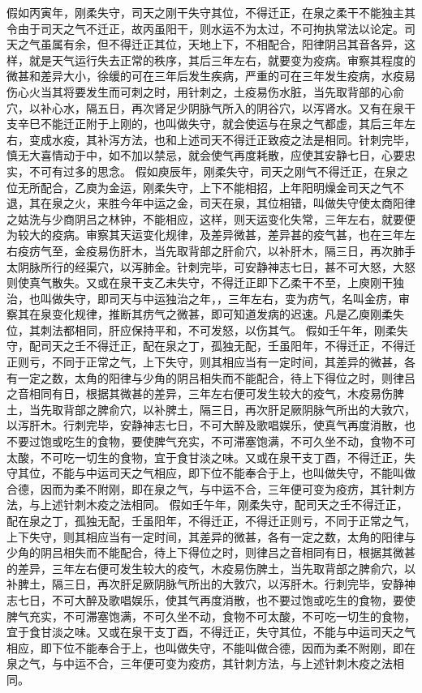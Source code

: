 \documentclass[a4paper,12pt,UTF8,twoside]{ctexbook}
\begin{document}
假如丙寅年，刚柔失守，司天之刚干失守其位，不得迁正，在泉之柔干不能独主其令由于司天之气不迁正，故丙虽阳干，则水运不为太过，不可拘执常法以论定。司天之气虽属有余，但不得迁正其位，天地上下，不相配合，阳律阴吕其音各异，这样，就是天气运行失去正常的秩序，其后三年左右，就要变为疫病。审察其程度的微甚和差异大小，徐缓的可在三年后发生疾病，严重的可在三年发生疫病，水疫易伤心火当其将要发生而可刺之时，用针刺之，土疫易伤水脏，当先取背部的心俞穴，以补心水，隔五日，再次肾足少阴脉气所入的阴谷穴，以泻肾水。又有在泉干支辛巳不能迁正附于上刚的，也叫做失守，就会使运与在泉之气都虚，其后三年左右，变成水疫，其补泻方法，也和上述司天不得迁正致疫之法是相同。针刺完毕，慎无大喜情动于中，如不加以禁忌，就会使气再度耗散，应使其安静七日，心要忠实，不可有过多的思念。
假如庾辰年，刚柔失守，司天之刚气不得迁正，在泉之位无所配合，乙庾为金运，刚柔失守，上下不能相招，上年阳明燥金司天之气不退，其在泉之火，来胜今年中运之金，司天在泉，其位相错，叫做失守使太商阳律之姑洗与少商阴吕之林钟，不能相应，这样，则天运变化失常，三年左右，就要便为较大的疫病。审察其天运变化规律，及差异微甚，差异甚的疫气甚，也在三年左右疫疠气至，金疫易伤肝木，当先取背部之肝俞穴，以补肝木，隔三日，再次肺手太阴脉所行的经渠穴，以泻肺金。针刺完毕，可安静神志七日，甚不可大怒，大怒则使真气散失。又或在泉干支乙未失守，不得迁正即下乙柔干不至，上庾刚干独治，也叫做失守，即司天与中运独治之年，，三年左右，变为疠气，名叫金疠，审察其在泉变化规律，推断其疠气之微甚，即可知道发病的迟速。凡是乙庾刚柔失位，其刺法都相同，肝应保持平和，不可发怒，以伤其气。
假如壬午年，刚柔失守，配司天之壬不得迁正，配在泉之丁，孤独无配，壬虽阳年，不得迁正，不得迁正则亏，不同于正常之气，上下失守，则其相应当有一定时间，其差异的微甚，各有一定之数，太角的阳律与少角的阴吕相失而不能配合，待上下得位之时，则律吕之音相同有日，根据其微甚的差异，三年左右便可发生较大的疫气，木疫易伤脾土，当先取背部之脾俞穴，以补脾土，隔三日，再次肝足厥阴脉气所出的大敦穴，以泻肝木。行刺完毕，安静神志七日，不可大醉及歌唱娱乐，使真气再度消散，也不要过饱或吃生的食物，要使脾气充实，不可滞塞饱满，不可久坐不动，食物不可太酸，不可吃一切生的食物，宜于食甘淡之味。又或在泉干支丁酉，不得迁正，失守其位，不能与中运司天之气相应，即下位不能奉合于上，也叫做失守，不能叫做合德，因而为柔不附刚，即在泉之气，与中运不合，三年便可变为疫疠，其针刺方法，与上述针刺木疫之法相同。
假如壬午年，刚柔失守，配司天之壬不得迁正，配在泉之丁，孤独无配，壬虽阳年，不得迁正，不得迁正则亏，不同于正常之气，上下失守，则其相应当有一定时间，其差异的微甚，各有一定之数，太角的阳律与少角的阴吕相失而不能配合，待上下得位之时，则律吕之音相同有日，根据其微甚的差异，三年左右便可发生较大的疫气，木疫易伤脾土，当先取背部之脾俞穴，以补脾土，隔三日，再次肝足厥阴脉气所出的大敦穴，以泻肝木。行刺完毕，安静神志七日，不可大醉及歌唱娱乐，使其气再度消散，也不要过饱或吃生的食物，要使脾气充实，不可滞塞饱满，不可久坐不动，食物不可太酸，不可吃一切生的食物，宜于食甘淡之味。又或在泉干支丁酉，不得迁正，失守其位，不能与中运司天之气相应，即下位不能奉合于上，也叫做失守，不能叫做合德，因而为柔不附刚，即在泉之气，与中运不合，三年便可变为疫疠，其针刺方法，与上述针刺木疫之法相同。
\end{document}
